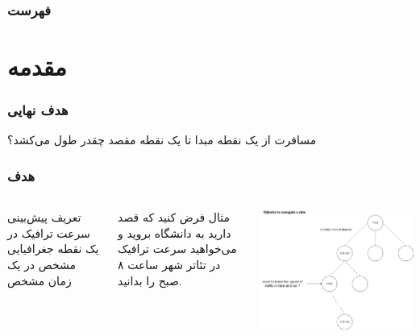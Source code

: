 \documentclass{beamer}
\subtitle{%
  پروژه کارشناسی\\
  دکتر صفابخش
}
\institute[]{دانشگاه صنعتی امیرکبیر}
\begin{document}
\begin{frame}
  \titlepage{}
\end{frame}

\begin{frame}
  \frametitle{فهرست}
  \tableofcontents{}
\end{frame}

\section{مقدمه}

\begin{frame}
  \frametitle{هدف نهایی}
  \begin{block}{}
    مسافرت از یک نقطه مبدا تا یک نقطه مقصد چقدر طول می‌کشد؟
  \end{block}
\end{frame}

\begin{frame}
  \frametitle{هدف}
  \begin{columns}
    \begin{block}{تعریف}
      پیش‌بینی سرعت ترافیک در یک نقطه جغرافیایی مشخص در یک زمان مشخص
    \end{block}
    \pause
    \begin{block}{مثال}
      فرض کنید که قصد دارید به دانشگاه بروید و می‌خواهید سرعت ترافیک در تئاتر شهر ساعت ۸ صبح را بدانید.
    \end{block}
    \pause
    \includegraphics[height=0.5\textheight]{./img/dijkstra.png}
  \end{columns}
\end{frame}
\end{document}
